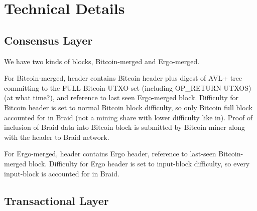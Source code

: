 \documentclass{llncs}   %
\newcommand{\bc}{Braid}
\begin{document}


\section{Technical Details}
\label{sec-techdetails}

\subsection{Consensus Layer}

We have two kinds of blocks, Bitcoin-merged and Ergo-merged.

For Bitcoin-merged, header contains Bitcoin header plus digest of AVL+ tree committing to the FULL Bitcoin UTXO set (including OP\_RETURN UTXOS) (at what time?), and reference to last seen Ergo-merged block. Difficulty for Bitcoin header is set to normal Bitcoin block difficulty, so only Bitcoin full block accounted for in Braid (not a mining share with lower difficulty like in). Proof of inclusion of Braid data into Bitcoin block is submitted by Bitcoin miner along with the header to Braid network.

For Ergo-merged, header contains Ergo header, reference to last-seen Bitcoin-merged block. Difficulty for Ergo header is set to input-block difficulty, so every input-block is accounted for in Braid. 


\subsection{Transactional Layer}
\end{document}
